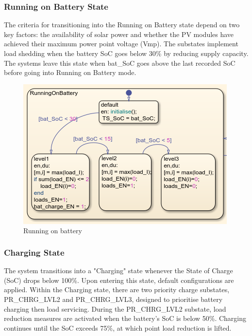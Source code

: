 \subsubsection{Running on Battery State}
The criteria for transitioning into the Running on Battery state depend on two key factors: the availability of solar power and whether the PV modules have achieved their maximum power point voltage (Vmp). The substates implement load shedding when the battery SoC goes below 30\% by reducing supply capacity. The systems leave this state when bat\_SoC goes above the last recorded SoC before going into Running on Battery mode.\par
\begin{figure}[H]
	\centering
	\includegraphics[totalheight=8cm]{Figures/running on battery.png}
	\caption{Running on battery}
\end{figure}
\subsubsection{Charging State}
The system transitions into a "Charging" state whenever the State of Charge (SoC) drops below 100\%. Upon entering this state, default configurations are applied. Within the Charging state, there are two priority charge substates, PR\_CHRG\_LVL2 and PR\_CHRG\_LVL3, designed to prioritise battery charging then load servicing.
During the PR\_CHRG\_LVL2 substate, load reduction measures are activated when the battery's SoC is below 50\%. Charging continues until the SoC exceeds 75\%, at which point load reduction is lifted.


